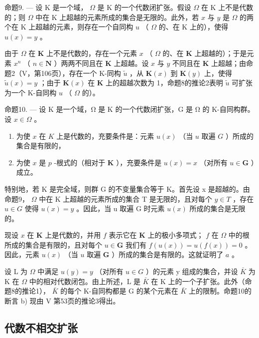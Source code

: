 命题9. --- 设 K 是一个域， \(\Omega\) 是 K 的一个代数闭扩张。假设 \(\Omega\) 在 K 上不是代数的；则 \(\Omega\) 中在 K 上超越的元素所成的集合是无限的。此外，若 \(x\) 与 \(y\) 是 \(\Omega\) 的两个在 K 上超越的元素，则存在一个自同构 \(u\) （ \(\Omega\) 的、在 K 上的），使得 \(u(x) = y\) 。

由于 \(\Omega\) 在 \(\mathbf{K}\) 上不是代数的，存在一个元素 \(x\) （ \(\Omega\) 的、在 \(\mathbf{K}\) 上超越的）；于是元素 \(x^n\) （ \(n \in \mathbf{N}\) ）两两不同且在 \(\mathbf{K}\) 上超越。设 \(x\) 与 \(y\) 不同且在 \(\mathbf{K}\) 上超越；由命题2（V，第106页），存在一个 K-同构 \(\tilde{u}\) ，从 \(\mathbf{K}(x)\) 到 \(\mathbf{K}(y)\) 上，使得 \(\tilde{u}(x) = y\) ；由于 \(\mathbf{K}(x)\) 在 \(\mathbf{K}\) 上的超越次数为 1，命题8的推论2表明 \(\tilde{u}\) 可扩张为一个 K-自同构 \(u\) （ \(\Omega\) 的）。

命题10. --- 设 K 是一个域，Ω 是 K 的一个代数闭扩张，G 是 Ω 的 K-自同构群。设 \(x \in \Omega\) 。

\begin{enumerate}
\def\labelenumi{\alph{enumi})}
\item
  为使 \(x\) 在 \(K\) 上是代数的，充要条件是：元素 \(u(x)\) （当 \(u\) 取遍 \(G\) ）所成的集合是有限的，
\item
  为使 \(x\) 是 \(p\) -根式的（相对于 \(\mathbf{K}\) ），充要条件是 \(u(x) = x\) （对所有 \(u \in \mathbf{G}\) ）成立。
\end{enumerate}

特别地，若 K 是完全域，则群 G 的不变量集合等于 K。首先设 x 是超越的。由命题9， \(\Omega\) 中在 K 上超越的元素所成的集合 T 是无限的，且对每个 \(y \in T\) ，存在 \(u \in G\) 使得 \(u(x) = y\) 。因此，当 u 取遍 G 时元素 \(u(x)\) 所成的集合是无限的。

现设 \(x\) 在 \(\mathbf{K}\) 上是代数的，并用 \(f\) 表示它在 \(\mathbf{K}\) 上的极小多项式； \(f\) 在 \(\Omega\) 中的根所成的集合是有限的，且对每个 \(u \in \mathbf{G}\) 我们有 \(f(u(x)) = u(f(x)) = 0\) 。因此，元素 \(u(x)\) （当 \(u\) 取遍 \(\mathbf{G}\) ）所成的集合是有限的。这就证明了 \(a\) 。

设 L 为 \(\Omega\) 中满足 \(u(y)=y\) （对所有 \(u\in G\) ）的元素 y 组成的集合，并设 \(\bar{K}\) 为 K 在 \(\Omega\) 中的相对代数闭包。由上所述，L 是 \(\bar{K}\) 在 K 上的一个子扩张。此外（命题8的推论1）， \(\bar{K}\) 的每个 K-自同构都是 G 的某个元素在 \(\bar{K}\) 上的限制。命题10的断言 b) 现由 V 第53页的推论3得出。

\subsection{代数不相交扩张}

